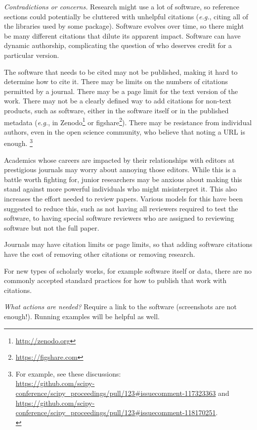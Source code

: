 \documentclass[a4paper,UKenglish]{dagman}
\newcommand{\eg}{\emph{e.g.},\xspace}
\begin{document}
\emph{Contradictions or concerns.}
Research might use a lot of software, so reference sections could potentially be cluttered with unhelpful citations (\eg citing all of the libraries used by some package). 
Software evolves over time, so there might be many different citations that dilute its apparent impact. 
Software can have dynamic authorship, complicating the question of who deserves credit for a particular version. 

The software that needs to be cited may not be published, making it hard to determine how to cite it.  There may be limits on the numbers of citations permitted by a journal.  There may be a page limit for the text version of the work.  There may not be a clearly defined way to add citations for non-text products, such as software, either in the software itself or in the published metadata (\eg in Zenodo\footnote{\url{http://zenodo.org}} or figshare\footnote{\url{https://figshare.com}}).
There may be resistance from individual authors, even in the open science community, who believe that noting a URL is enough.%
\footnote{For example, see these discussions:\\
\url{https://github.com/scipy-conference/scipy_proceedings/pull/123\#issuecomment-117323363} and\\
\url{https://github.com/scipy-conference/scipy_proceedings/pull/123\#issuecomment-118170251}.\\
}

Academics whose careers are impacted by their relationships with editors at prestigious journals may worry about annoying those editors. While this is a battle worth fighting for, junior researchers may be anxious about making this stand against more powerful individuals who might misinterpret it. 
This also increases the effort needed to review papers.  Various models for this have been suggested to reduce this, such as not having all reviewers required to test the software, to having special software reviewers who are assigned to reviewing software but not the full paper.

Journals may have citation limits or page limits, so that adding software citations have the cost of removing other citations or removing research.

For new types of scholarly works, for example software itself or data, there are no commonly accepted standard practices for how to publish that work with citations.

\emph{What actions are needed?}
Require a link to the software (screenshots are not enough!). Running examples will be helpful as well.
\end{document}
